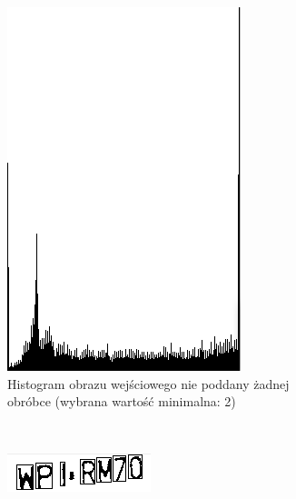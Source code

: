 \begin{figure}
\begin{subfigure}[b]{0.45\textwidth}
    \includegraphics[width=\textwidth]{img/research-min-histogram-bad-histogram}
    \caption{Histogram obrazu wejściowego nie poddany żadnej obróbce (wybrana wartość minimalna: 2)}
    \label{fig:research_min_histogram_bad_histogram}
  \end{subfigure}
~
  \begin{subfigure}[b]{0.45\textwidth}
    \includegraphics[width=\textwidth]{img/research-min-histogram-good-output}

\end{subfigure}
\end{figure}
